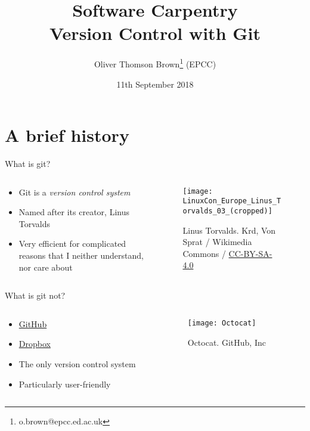 \documentclass[presentation]{beamer}
\author{Oliver Thomson Brown\thanks{o.brown@epcc.ed.ac.uk} (EPCC)}
\date{11th September 2018}
\title{Software Carpentry \\ Version Control with Git}
\begin{document}
\maketitle

\section{A brief history}
\begin{frame}{What is git?}
	\begin{columns}
		\begin{column}{0.5\textwidth}
			\begin{itemize}
				\item Git is a \emph{version control system}
				\item Named after its creator, Linus Torvalds
				\item Very efficient for complicated reasons that I neither understand, nor care about
			\end{itemize}
		\end{column}
		\begin{column}{0.5\textwidth}
			\begin{figure}
				\centering
				\texttt{[image: LinuxCon\_Europe\_Linus\_Torvalds\_03\_(cropped)]}
				\caption{\label{fig:0-1}Linus Torvalds. \textcopyright Krd, Von Sprat / Wikimedia Commons / \href{https://creativecommons.org/licenses/by-sa/4.0/}{CC-BY-SA-4.0} }
			\end{figure}		
		\end{column}
	\end{columns}
\end{frame}

\begin{frame}{What is git not?}
	\begin{columns}
		\begin{column}{0.5\textwidth}
			\begin{itemize}
				\item \href{https://github.com/}{GitHub}
				\item \href{https://www.dropbox.com/}{Dropbox}
				\item The only version control system
				\item Particularly user-friendly
			\end{itemize}
		\end{column}
		\begin{column}{0.5\textwidth}
			\begin{figure}
				\centering
				\texttt{[image: Octocat]}
				\caption{\label{fig:0-2}Octocat.  GitHub, Inc}
			\end{figure}		
		\end{column}
	\end{columns}
\end{frame}
\end{document}
